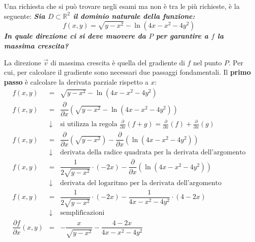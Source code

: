 \documentclass[a4paper]{article}
\begin{document}
	Una richiesta che si può trovare negli esami ma non è tra le più richieste, è la seguente: \textcolor{Green4}{\textbf{\emph{Sia $D\subset\mathbb{R}^{2}$ il dominio naturale della funzione:}}
	\begin{equation*}
		f\left(x,y\right) = \sqrt{y-x^{2}}-\ln\left(4x-x^{2}-4y^{2}\right)
	\end{equation*}
	\textbf{\emph{In quale direzione ci si deve muovere da $P$ per garantire a $f$ la massima crescita?}}}\newline

	\noindent
	La direzione $\overrightarrow{v}$ di massima crescita è quella del gradiente di $f$ nel punto $P$. Per cui, per calcolare il gradiente sono necessari due passaggi fondamentali. Il \textbf{primo passo} è calcolare la derivata parziale rispetto a $x$:
	\begin{equation*}
		\begin{array}{rcl}
			f\left(x,y\right) &=& \sqrt{y-x^{2}}-\ln\left(4x-x^{2}-4y^{2}\right) \\ [1em]
			f\left(x,y\right) &=& \dfrac{\partial}{\partial x}\left( \sqrt{y-x^{2}}-\ln\left(4x-x^{2}-4y^{2}\right) \right) \\ [1.5em]
			&\downarrow& \text{si utilizza la regola } \frac{\partial}{\partial x}\left(f+g\right) = \frac{\partial}{\partial x}\left(f\right) + \frac{\partial}{\partial x}\left(g\right) \\ [1em]
			f\left(x,y\right) &=& \dfrac{\partial}{\partial x}\left( \sqrt{y-x^{2}}\right)- \dfrac{\partial}{\partial x}\left(\ln\left(4x-x^{2}-4y^{2}\right) \right) \\ [1.5em]
			&\downarrow& \text{derivata della radice quadrata per la derivata dell'argomento} \\ [1em]
			f\left(x,y\right) &=& \dfrac{1}{2\sqrt{y-x^{2}}}\cdot\left(-2x\right) - \dfrac{\partial}{\partial x}\left(\ln\left(4x-x^{2}-4y^{2}\right) \right) \\ [1.5em]
			&\downarrow& \text{derivata del logaritmo per la derivata dell'argomento} \\ [1em]
			f\left(x,y\right) &=& \dfrac{1}{2\sqrt{y-x^{2}}}\cdot\left(-2x\right) - \dfrac{1}{4x-x^{2}-4y^{2}} \cdot \left(4-2x\right) \\ [1.5em]
			&\downarrow& \text{semplificazioni} \\ [1em]
			\dfrac{\partial f}{\partial x}\left(x,y\right) &=& -\dfrac{x}{\sqrt{y-x^{2}}} - \dfrac{4-2x}{4x-x^{2}-4y^{2}} \\ [1.5em]
		\end{array}
	\end{equation*}\newpage
\end{document}
